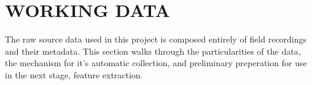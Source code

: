 \chapter{WORKING DATA}

The raw source data used in this project is composed entirely of field recordings
and their metadata.
This section walks through the particularities of the data, the mechanism for
it's automatic collection, and preliminary preperation for use in the next
stage, feature extraction.

